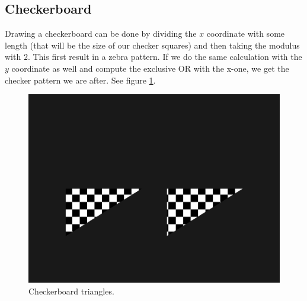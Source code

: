 \documentclass[]{article}
\begin{document}
\begin{multicols}{2}
\subsection{Checkerboard}
Drawing a checkerboard can be done by dividing the $x$ coordinate with some length (that will be the size of our checker squares) and then taking the modulus with $2$. This first result in a zebra pattern. If we do the same calculation with the $y$ coordinate as well and compute the exclusive OR with the x-one, we get the checker pattern we are after. See figure \ref{fig:tris_checker}.
\begin{figure}[H]
\centering
\includegraphics[width=\columnwidth]{checker.png}
\caption{Checkerboard triangles.}
\label{fig:tris_checker}
\end{figure}


\end{multicols}
\end{document}
